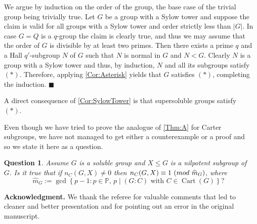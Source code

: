 \documentclass[10pt,a4paper]{amsart}
\numberwithin{equation}{section}
\DeclareMathOperator{\cart}{Cart}
\renewcommand{\leq}{\leqslant}
\newcommand{\md}[1]{\,\left(\textnormal{mod}\ #1\right)}
\newenvironment{proofof}{{\bf {Proof.} }}{\hfill $\blacksquare$ \\}
\newtheorem{question}{Question}
\begin{document}
\begin{proofof}
We argue by induction on the order of the group,
the base case of the trivial group being trivially true.
Let $G$ be a group with a Sylow tower and suppose the
claim is valid for all groups with a Sylow tower and order
strictly less than $|G|$. In case $G=Q$ is a $q$-group the claim is clearly true, and thus we may assume that the order of $G$  is divisible by at least two primes.  
Then there exists a prime $q$ and a Hall $q'$-subgroup $N$
of $G$ such that $N$ is normal in $G$ and $N < G$. 
Clearly $N$ is a  group with a Sylow tower and thus, by induction, 
$N$ and all its subgroups satisfy $(*)$.
Therefore, applying \autoref{Cor:Asterisk} yields that $G$
satisfies $(*)$, completing the induction.
\end{proofof}

A direct consequence of \autoref{Cor:SylowTower}
is that supersoluble groups satisfy $(*)$. 

Even though we have tried to prove the analogue of \autoref{Thm:A} 
for Carter subgroups, we have not managed to get either a counterexample 
or a proof and so we state it here as a question.
\begin{question}\label{Conj:Carter}
Assume $G$ is a soluble group and $X\leq G$ is a nilpotent subgroup of $G$. 
Is it true that if  $n_C(G,X) \neq 0$ then  $n_C(G,X) \equiv 1\md{\widehat{m}_G}$, 
where 
\[
\widehat{m}_G:= \gcd\left\{p-1: p\in\mathbb{P},\, p \mid (G:C) \mbox{ with } C\in\cart(G)\right\}? 
\]
\end{question}  

{\bf Acknowledgment.} 
We thank the referee for valuable comments that led to cleaner and better presentation and 
for pointing out an error in the original manuscript.
\end{document}
